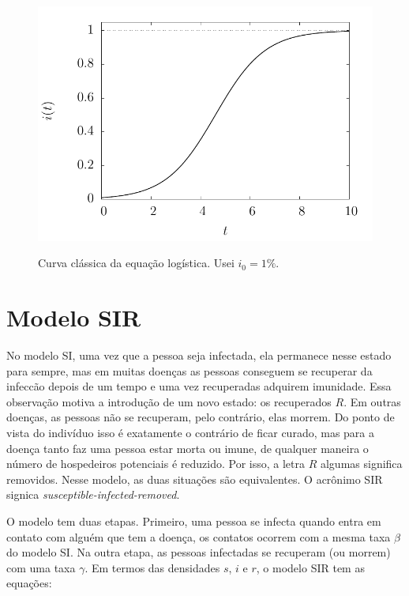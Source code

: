 \documentclass[a4paper,11pt]{report}
\begin{document}
\begin{figure}[ht!]
\begin{center}
\includegraphics[scale=0.8]{./images/logistic.pdf}
\label{fig:logistic}
\caption{Curva cl\'assica da equa\c{c}\~ao log\'istica. Usei $i_0=1\%$.}
\end{center}
\end{figure}


\section{Modelo SIR}  

No modelo SI, uma vez que a pessoa seja infectada, ela permanece nesse estado para sempre, mas em muitas doen\c{c}as as pessoas conseguem se recuperar da infec{c}\~ao depois de um tempo e uma vez recuperadas adquirem imunidade. Essa observa\c{c}\~ao motiva a introdu\c{c}\~ao de um novo estado: os recuperados $R$. Em outras doen\c{c}as, as pessoas n\~ao se recuperam, pelo contr\'ario, elas morrem. Do ponto de vista do indiv\'iduo isso \'e exatamente o contr\'ario de ficar curado, mas para a doen\c{c}a tanto faz uma pessoa estar morta ou imune, de qualquer maneira o n\'umero de  hospedeiros potenciais \'e reduzido. Por isso, a letra $R$ algumas significa removidos. Nesse modelo, as duas situa\c{c}\~oes s\~ao equivalentes. O acr\^onimo SIR signica \textit{susceptible-infected-removed}.

O modelo tem duas etapas. Primeiro, uma pessoa se infecta quando entra em contato com algu\'em que tem a doen\c{c}a, os contatos ocorrem com a mesma taxa $\beta$ do modelo SI. Na outra etapa, as pessoas infectadas se recuperam (ou morrem) com uma taxa $\gamma$. Em termos das densidades $s$, $i$ e $r$, o modelo SIR tem as equa\c{c}\~oes:
\end{document}
